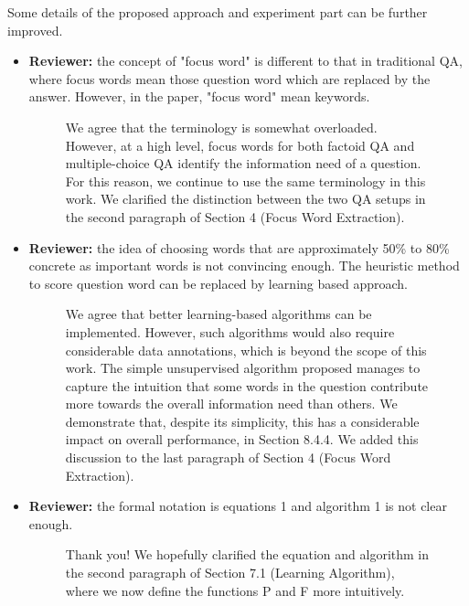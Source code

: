 \documentclass[10pt]{article}
\begin{document}

Some details of the proposed approach and experiment part can be further
improved.

\begin{itemize}

\item \textbf{Reviewer:} the concept of "focus word" is different to that in traditional QA, where
focus words mean those question word which are replaced by the answer.
However, in the paper, "focus word" mean keywords.

\begin{figure}[H]
\caption{ We agree that the terminology is somewhat overloaded. However, at a high level, focus words for both factoid QA and multiple-choice QA identify the information need of a question. For this reason, we continue to use the same terminology in this work. We clarified the distinction between the two QA setups in the second paragraph of Section 4 (Focus Word Extraction). }
\label{resp:focusword}
\end{figure}

\item \textbf{Reviewer:} the idea of choosing words that are approximately 50\% to 80\% concrete as
important words is not convincing enough. The heuristic method to score
question word can be replaced by learning based approach.

\begin{figure}[H]
\caption{ We agree that better learning-based algorithms can be implemented. However, such algorithms would also require considerable data annotations, which is beyond the scope of this work. The simple unsupervised algorithm proposed manages to capture the intuition that some words in the question contribute more towards the overall information need than others. We demonstrate that, despite its simplicity, this has a considerable impact on overall performance, in Section 8.4.4. We added this discussion to the last paragraph of Section 4 (Focus Word Extraction).  }
\label{resp:conc}
\end{figure}

\item \textbf{Reviewer:} the formal notation is equations 1 and algorithm 1 is not clear enough.

\begin{figure}[H]
\caption{ Thank you! We hopefully clarified the equation and algorithm in the second paragraph of Section 7.1 (Learning Algorithm), where we now define the functions P and F more intuitively.}
\label{resp:equ}
\end{figure}


\end{itemize}
\end{document}
